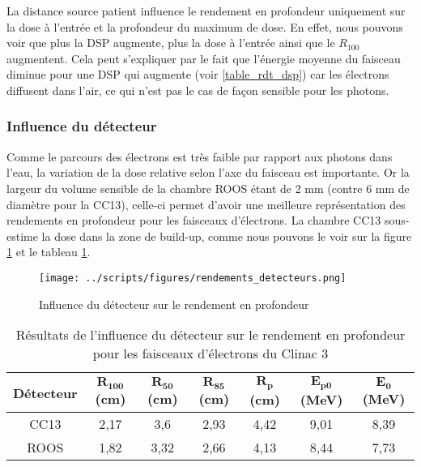 \documentclass{article}
\begin{document}
La distance source patient influence le rendement en profondeur uniquement sur la dose à l'entrée et la profondeur du maximum de dose. En effet, nous pouvons voir que plus la DSP augmente, plus la dose à l'entrée ainsi que le $R_{100}$ augmentent. Cela peut s'expliquer par le fait que l'énergie moyenne du faisceau diminue pour une DSP qui augmente (voir \ref*{table_rdt_dsp}) car les électrons diffusent dans l'air, ce qui n'est pas le cas de façon sensible pour les photons.

\subsubsection{Influence du détecteur}

Comme le parcours des électrons est très faible par rapport aux photons dans l'eau, la variation de la dose relative selon l'axe du faisceau est importante. Or la largeur du volume sensible de la chambre ROOS étant de 2 mm (contre 6 mm de diamètre pour la CC13), celle-ci permet d'avoir une meilleure représentation des rendements en profondeur pour les faisceaux d'électrons. La chambre CC13 sous-estime la dose dans la zone de build-up, comme nous pouvons le voir sur la figure \ref*{fig_rdt_detecteur} et le tableau \ref*{table_rdt_detecteurs}.

\begin{figure}[h!]
  \centering
  \texttt{[image: ../scripts/figures/rendements\_detecteurs.png]}
  \caption{Influence du détecteur sur le rendement en profondeur}
  \label{fig_rdt_detecteur}
\end{figure}

\begin{table}[h]
  \centering
  \begin{tabular}{ccccccc}
  \toprule
  \textbf{Détecteur} & $\mathbf{R_{100}}$ \textbf{(cm)} & $\mathbf{R_{50}}$ \textbf{(cm)} & $\mathbf{R_{85}}$ \textbf{(cm)} & $\mathbf{R_p}$ \textbf{(cm)} & $\mathbf{E_{p0}}$ \textbf{(MeV)} & $\mathbf{E_0}$ \textbf{(MeV)} \\ \toprule
  CC13 & 2,17 & 3,6 & 2,93 & 4,42 & 9,01 & 8,39 \\
  ROOS & 1,82 & 3,32 & 2,66 & 4,13 & 8,44 & 7,73 \\ \bottomrule
  \end{tabular}
  \caption[short]{Résultats de l'influence du détecteur sur le rendement en profondeur pour les faisceaux d'électrons du Clinac 3}
  \label{table_rdt_detecteurs}
\end{table}
\end{document}
